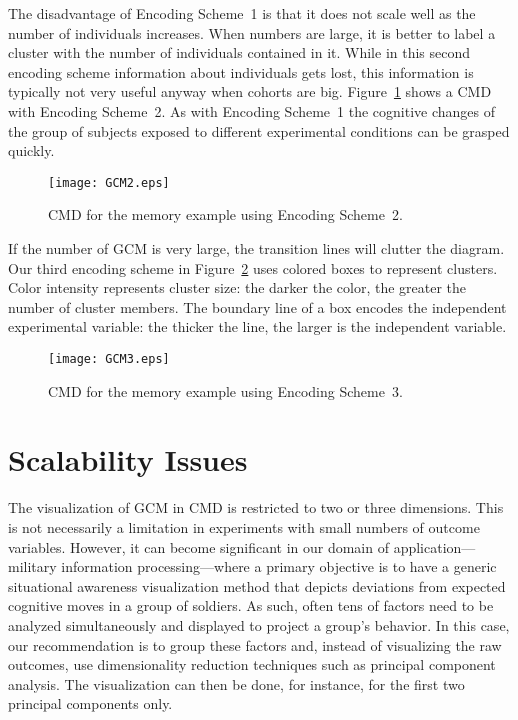 \documentclass[conference]{IEEEtran}
\begin{document}
The disadvantage of Encoding Scheme~1 is that it does not scale well as the number of individuals
increases. When numbers are large, it is better to label a cluster with the number of individuals
contained in it. While in this second encoding scheme information about individuals gets lost, this
information is typically not very useful anyway when cohorts are big. Figure~\ref{fig:cmd2} shows a
CMD with Encoding Scheme~2. As with Encoding Scheme~1 the cognitive changes of the group of
subjects exposed to different experimental conditions can be grasped quickly.

\begin{figure}[!t]
\centering
\texttt{[image: GCM2.eps]}
\caption{CMD for the memory example using Encoding Scheme~2.} \label{fig:cmd2}
\end{figure}

If the number of GCM is very large, the transition lines will clutter the diagram. Our third
encoding scheme in Figure~\ref{fig:cmd3} uses colored boxes to represent clusters. Color intensity
represents cluster size: the darker the color, the greater the number of cluster members. The
boundary line of a box encodes the independent experimental variable: the thicker the line, the
larger is the independent variable.

\begin{figure}[!t]
\centering
\texttt{[image: GCM3.eps]}
\caption{CMD for the memory example using Encoding Scheme~3.} \label{fig:cmd3}
\end{figure}

\section{Scalability Issues}
The visualization of GCM in CMD is restricted to two or three dimensions. This is not necessarily a
limitation in experiments with small numbers of outcome variables. However, it can become
significant in our domain of application---military information processing---where a primary
objective is to have a generic situational awareness visualization method that depicts deviations
from expected cognitive moves in a group of soldiers. As such, often tens of factors need to be
analyzed simultaneously and displayed to project a group's behavior. In this case, our
recommendation is to group these factors and, instead of visualizing the raw outcomes, use
dimensionality reduction techniques such as principal component analysis. The visualization can
then be done, for instance, for the first two principal components only.
\end{document}
